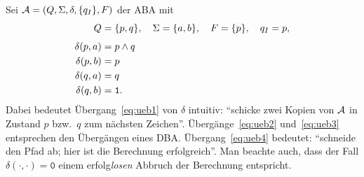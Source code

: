 \documentclass[fontsize=11pt, twoside=false, numbers=autoenddot]{scrbook}
\begin{document}
Sei $\mathcal{A} = (Q,\Sigma,\delta,\{q_I\},F)$ der ABA mit
%
\begin{align}
  Q & = \{p,q\},\quad \Sigma = \{a,b\},\quad F = \{p\},\quad q_I = p, \notag \\[4pt]
  \delta(p,a) & = p \land q   \label{eq:ueb1}\\
  \delta(p,b) & = p           \label{eq:ueb2}\\
  \delta(q,a) & = q           \label{eq:ueb3}\\
  \delta(q,b) & = \texttt{1}. \label{eq:ueb4}
\end{align}
%
Dabei bedeutet Übergang~\eqref{eq:ueb1} von $\delta$ intuitiv:
"`schicke zwei Kopien von $\mathcal{A}$ in Zustand $p$ bzw.\ $q$ zum nächsten Zeichen"'.
Übergänge~\eqref{eq:ueb2} und~\eqref{eq:ueb3} entsprechen den Übergängen eines DBA.
Übergang~\eqref{eq:ueb4} bedeutet: "`schneide den Pfad ab; hier ist die Berechnung erfolgreich"'.
Man beachte auch, dass der Fall $\delta(\cdot,\cdot)=\texttt{0}$
einem erfolg\emph{losen} Abbruch der Berechnung entspricht.
\end{document}
